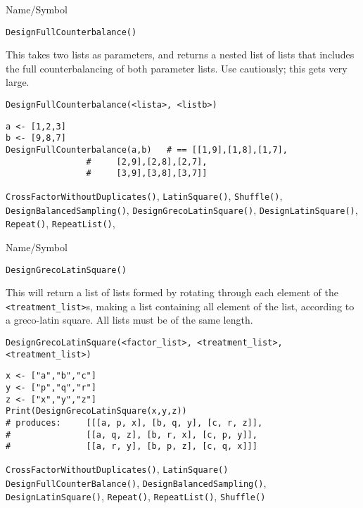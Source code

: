 \begin{desc}{Name/Symbol}

\item[Name/Symbol]	\verb+DesignFullCounterbalance()+

\item[Description]	This takes two lists as parameters, and returns a nested list 
		of lists that includes the full counterbalancing of both 
		parameter lists.  Use cautiously; this gets very large.

\item[Usage]
\begin{verbatim}
DesignFullCounterbalance(<lista>, <listb>)
\end{verbatim}

\item[Example]
\begin{verbatim}
a <- [1,2,3]
b <- [9,8,7]
DesignFullCounterbalance(a,b)	# == [[1,9],[1,8],[1,7],
				#     [2,9],[2,8],[2,7],
				#     [3,9],[3,8],[3,7]]
\end{verbatim}

\item[See Also] \verb+CrossFactorWithoutDuplicates()+,
  \verb+LatinSquare()+, \verb+Shuffle()+,
  \verb+DesignBalancedSampling()+, \verb+DesignGrecoLatinSquare()+, 
  \verb+DesignLatinSquare()+, \verb+Repeat()+, \verb+RepeatList()+,

\end{desc}

\rl




\begin{desc}{Name/Symbol}
\item[Name/Symbol]	\verb+DesignGrecoLatinSquare()+

\item[Description] This will return a list of lists formed by rotating
  through each element of the \verb+<treatment_list>+s, making a list
  containing all element of the list, according to a greco-latin
  square.  All lists must be of the same length.

\item[Usage]
\begin{verbatim}
DesignGrecoLatinSquare(<factor_list>, <treatment_list>, 
<treatment_list>)
\end{verbatim}

\item[Example]
\begin{verbatim}
x <- ["a","b","c"]
y <- ["p","q","r"]
z <- ["x","y","z"]
Print(DesignGrecoLatinSquare(x,y,z))
# produces:   	[[[a, p, x], [b, q, y], [c, r, z]], 
#               [[a, q, z], [b, r, x], [c, p, y]], 
#               [[a, r, y], [b, p, z], [c, q, x]]]
\end{verbatim}

\item[See Also] \verb+CrossFactorWithoutDuplicates()+, \verb+LatinSquare()+
  \verb+DesignFullCounterBalance()+, \verb+DesignBalancedSampling()+,
  \verb+DesignLatinSquare()+, \verb+Repeat()+, \verb+RepeatList()+,
  \verb+Shuffle()+
\end{desc}


